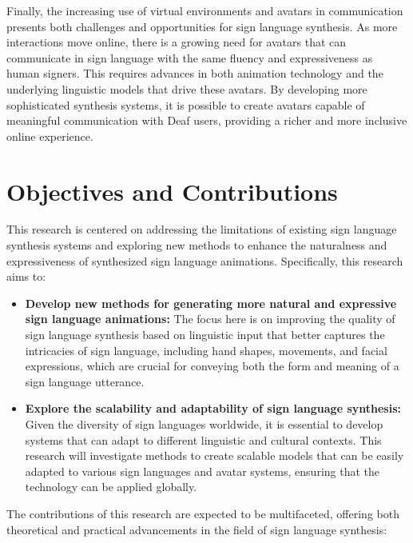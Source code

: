 \documentclass[../../main.tex]{subfiles}
\begin{document}
Finally, the increasing use of virtual environments and avatars in communication presents both challenges and opportunities for sign language synthesis. As more interactions move online, there is a growing need for avatars that can communicate in sign language with the same fluency and expressiveness as human signers. This requires advances in both animation technology and the underlying linguistic models that drive these avatars. By developing more sophisticated synthesis systems, it is possible to create avatars capable of meaningful communication with Deaf users, providing a richer and more inclusive online experience.

\section{Objectives and Contributions}

This research is centered on addressing the limitations of existing sign language synthesis systems and exploring new methods to enhance the naturalness and expressiveness of synthesized sign language animations. Specifically, this research aims to:

\begin{itemize}
    \item \textbf{Develop new methods for generating more natural and expressive sign language animations:} The focus here is on improving the quality of sign language synthesis based on linguistic input that better captures the intricacies of sign language, including hand shapes, movements, and facial expressions, which are crucial for conveying both the form and meaning of a sign language utterance.
    \item \textbf{Explore the scalability and adaptability of sign language synthesis:} Given the diversity of sign languages worldwide, it is essential to develop systems that can adapt to different linguistic and cultural contexts. This research will investigate methods to create scalable models that can be easily adapted to various sign languages and avatar systems, ensuring that the technology can be applied globally.
\end{itemize}

The contributions of this research are expected to be multifaceted, offering both theoretical and practical advancements in the field of sign language synthesis:
\end{document}
